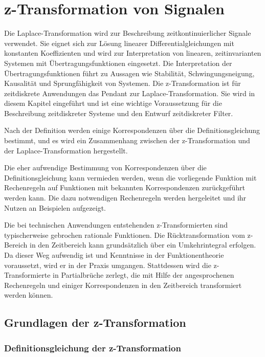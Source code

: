 \chapter{z-Transformation von Signalen}\label{sec:z-transformation-von-signalen}

Die Laplace-Transformation wird zur Beschreibung zeitkontinuierlicher Signale verwendet. Sie eignet sich zur Lösung linearer Differentialgleichungen mit konstanten Koeffizienten und wird zur Interpretation von linearen, zeitinvarianten Systemen mit Übertragungsfunktionen eingesetzt. Die Interpretation der Übertragungsfunktionen führt zu Aussagen wie Stabilität, Schwingungsneigung, Kausalität und Sprungfähigkeit von Systemen. Die z-Transformation ist für zeitdiskrete Anwendungen das Pendant zur Laplace-Transformation. Sie wird in diesem Kapitel eingeführt und ist eine wichtige Voraussetzung für die Beschreibung zeitdiskreter Systeme und den Entwurf zeitdiskreter Filter.

Nach der Definition werden einige Korrespondenzen über die Definitionsgleichung bestimmt, und es wird ein Zusammenhang zwischen der z-Transformation und der Laplace-Transformation hergestellt.

Die eher aufwendige Bestimmung von Korrespondenzen über die Definitionsgleichung kann vermieden werden, wenn die vorliegende Funktion mit Rechenregeln auf Funktionen mit bekannten Korrespondenzen zurückgeführt werden kann. Die dazu notwendigen Rechenregeln werden hergeleitet und ihr Nutzen an Beispielen aufgezeigt.

Die bei technischen Anwendungen entstehenden z-Transformierten sind typischerweise gebrochen rationale Funktionen. Die Rücktransformation vom z-Bereich in den Zeitbereich kann grundsätzlich über ein Umkehrintegral erfolgen. Da dieser Weg aufwendig ist und Kenntnisse in der Funktionentheorie voraussetzt, wird er in der Praxis umgangen. Stattdessen wird die z-Transformierte in Partialbrüche zerlegt, die mit Hilfe der angesprochenen Rechenregeln und einiger Korrespondenzen in den Zeitbereich transformiert werden können.

\section{Grundlagen der z-Transformation}\label{sec:5.1}

\subsection{Definitionsgleichung der z-Transformation}\label{sec:definitionsgleichung-der-z-transformation}

